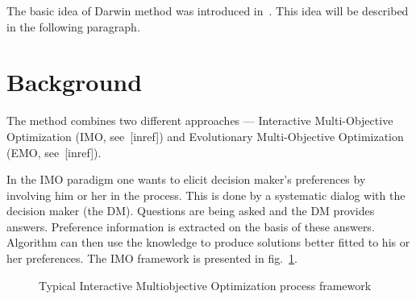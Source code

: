 The basic idea of Darwin method was introduced in~\cite{GMS09}. This idea will
be described in the following paragraph.

\section{Background}

The method combines two different approaches --- Interactive Multi-Objective
Optimization (IMO, see~[inref]) and Evolutionary Multi-Objective Optimization
(EMO, see~[inref]).

In the IMO paradigm one wants to elicit decision maker's preferences by
involving him or her in the process. This is done by a systematic dialog with
the decision maker (the DM). Questions are being asked and the DM provides
answers. Preference information is extracted on the basis of these answers. Algorithm
can then use the knowledge to produce solutions better fitted to his or her
preferences. The IMO framework is presented in
fig.~\ref{fig:interactive-process}.

\begin{figure} 
  \begin{center}
    \caption{Typical Interactive Multiobjective
      Optimization process framework\label{fig:interactive-process}}
  \end{center} 
\end{figure} 

